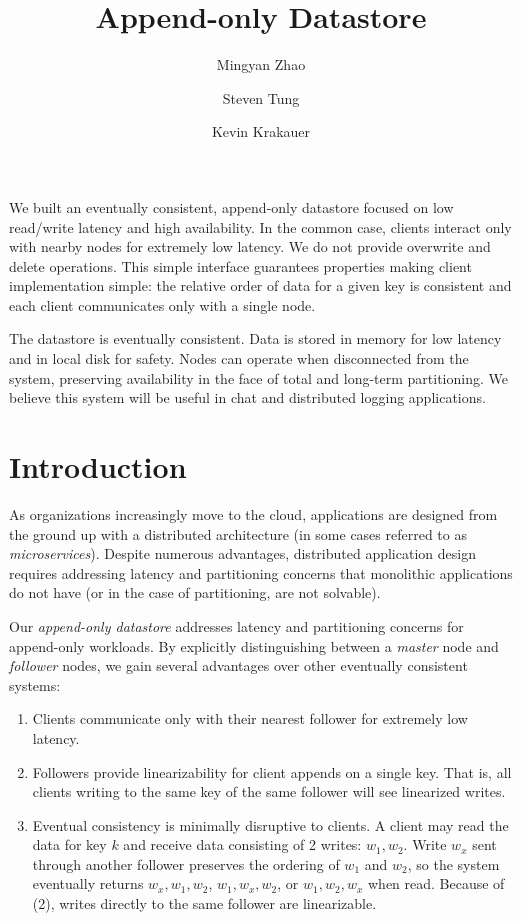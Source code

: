 \documentclass[11pt,english,twocolumn]{article}
\title{Append-only Datastore}
\author{
	Mingyan Zhao
	\and
	Steven Tung
	\and
	Kevin Krakauer
}
\date{}
\begin{document}
\maketitle


\section*{}
We built an eventually consistent, append-only datastore focused on low
read/write latency and high availability. In the common case, clients interact
only with nearby nodes for extremely low latency. We do not provide overwrite
and delete operations. This simple interface guarantees properties making client
implementation simple: the relative order of data for a given key is consistent
and each client communicates only with a single node.

The datastore is eventually consistent. Data is stored in memory for low latency
and in local disk for safety. Nodes can operate when disconnected from the
system, preserving availability in the face of total and long-term partitioning.
We believe this system will be useful in chat and distributed logging
applications.

\section{Introduction}
As organizations increasingly move to the cloud, applications are designed from
the ground up with a distributed architecture (in some cases referred to as
\textit{microservices}). Despite numerous advantages, distributed
application design requires addressing latency and partitioning concerns that
monolithic applications do not have (or in the case of partitioning, are not
solvable).

Our \textit{append-only datastore} addresses latency and partitioning concerns
for append-only workloads. By explicitly distinguishing between a
\textit{master} node and \textit{follower} nodes, we gain several advantages
over other eventually consistent systems:

\begin{enumerate}
	\item Clients communicate only with their nearest follower for extremely
		low latency.
	\item Followers provide linearizability for client appends on a single
		key. That is, all clients writing to the same key of the same
		follower will see linearized writes.
	\item Eventual consistency is minimally disruptive to clients. A client
		may read the data for key $k$ and receive data consisting of 2
		writes: $w_1, w_2$. Write $w_x$ sent through another follower
		preserves the ordering of $w_1$ and $w_2$, so the system
		eventually returns $w_x, w_1, w_2$, $w_1, w_x, w_2$, or $w_1,
		w_2, w_x$ when read.  Because of (2), writes directly to the
		same follower are linearizable.
\end{enumerate}
\end{document}
